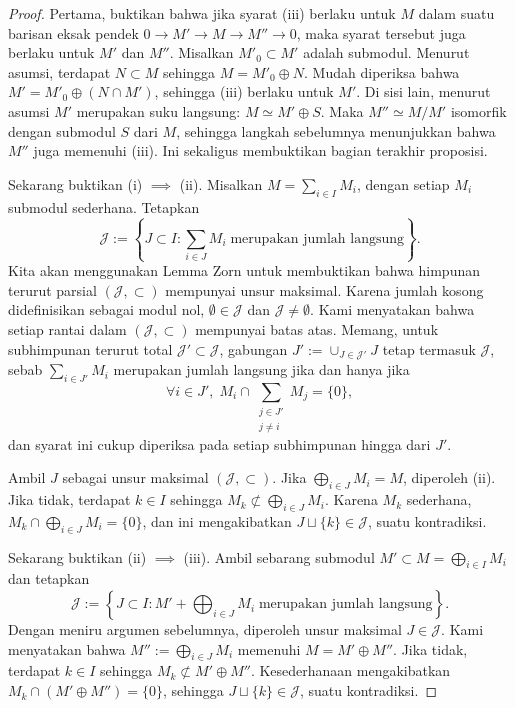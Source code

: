 \begin{proof}
	Pertama, buktikan bahwa jika syarat (iii) berlaku untuk $M$ dalam suatu barisan eksak pendek $0 \to M' \to M \to M'' \to 0$, maka syarat tersebut juga berlaku untuk $M'$ dan $M''$. Misalkan $M'_0 \subset M'$ adalah submodul. Menurut asumsi, terdapat $N \subset M$ sehingga $M = M'_0 \oplus N$. Mudah diperiksa bahwa $M' = M'_0 \oplus (N \cap M')$, sehingga (iii) berlaku untuk $M'$. Di sisi lain, menurut asumsi $M'$ merupakan suku langsung: $M \simeq M' \oplus S$. Maka $M'' \simeq M/M'$ isomorfik dengan submodul $S$ dari $M$, sehingga langkah sebelumnya menunjukkan bahwa $M''$ juga memenuhi (iii). Ini sekaligus membuktikan bagian terakhir proposisi.

	Sekarang buktikan (i) $\implies$ (ii). Misalkan $M = \sum_{i \in I} M_i$, dengan setiap $M_i$ submodul sederhana. Tetapkan
	\[ \mathcal{J} := \left\{ J \subset I: \sum_{i \in J} M_i \;\text{merupakan jumlah langsung} \right\}. \]
Kita akan menggunakan Lemma Zorn untuk membuktikan bahwa himpunan terurut parsial $(\mathcal{J}, \subset)$ mempunyai unsur maksimal. Karena jumlah kosong didefinisikan sebagai modul nol, $\emptyset \in \mathcal{J}$ dan $\mathcal{J} \neq \emptyset$. Kami menyatakan bahwa setiap rantai dalam $(\mathcal{J}, \subset)$ mempunyai batas atas. Memang, untuk subhimpunan terurut total $\mathcal{J}' \subset \mathcal{J}$, gabungan $J' := \cup_{J \in\mathcal{J}'} J$ tetap termasuk $\mathcal{J}$, sebab $\sum_{i \in J'} M_i$ merupakan jumlah langsung jika dan hanya jika
	\[ \forall i \in J', \; M_i \cap \sum_{\substack{j \in J' \\ j \neq i}} M_j = \{0\}, \]
dan syarat ini cukup diperiksa pada setiap subhimpunan hingga dari $J'$.
	
	Ambil $J$ sebagai unsur maksimal $(\mathcal{J}, \subset)$. Jika $\bigoplus_{i \in J} M_i = M$, diperoleh (ii). Jika tidak, terdapat $k \in I$ sehingga $M_k \not\subset \bigoplus_{i \in J} M_i$. Karena $M_k$ sederhana, $M_k \cap \bigoplus_{i \in J} M_i = \{0\}$, dan ini mengakibatkan $J \sqcup \{k\} \in \mathcal{J}$, suatu kontradiksi.
	
	Sekarang buktikan (ii) $\implies$ (iii). Ambil sebarang submodul $M' \subset M = \bigoplus_{i \in I} M_i$ dan tetapkan
	\[ \mathcal{J} := \left\{ J \subset I: M' + \bigoplus_{i \in J} M_i \; \text{merupakan jumlah langsung} \right\}. \]
Dengan meniru argumen sebelumnya, diperoleh unsur maksimal $J \in \mathcal{J}$. Kami menyatakan bahwa $M'' := \bigoplus_{i \in J} M_i$ memenuhi $M = M' \oplus M''$. Jika tidak, terdapat $k \in I$ sehingga $M_k \not\subset M' \oplus M''$. Kesederhanaan mengakibatkan $M_k \cap (M' \oplus M'') = \{0\}$, sehingga $J \sqcup \{k\} \in \mathcal{J}$, suatu kontradiksi.
	

\end{proof}

